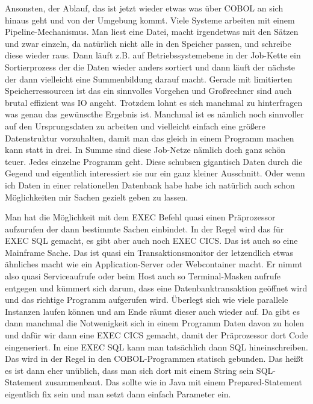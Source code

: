 {Ansonsten, der Ablauf, das ist jetzt wieder etwas was über COBOL an sich hinaus geht und von der Umgebung kommt. Viele Systeme arbeiten mit einem Pipeline-Mechanismus. Man liest eine Datei, macht irgendetwas mit den Sätzen und zwar einzeln, da natürlich nicht alle in den Speicher passen, und schreibe diese wieder raus. Dann läuft z.B. auf Betriebssystemebene in der Job-Kette ein Sortierprozess der die Daten wieder anders sortiert und dann läuft der nächste der dann vielleicht eine Summenbildung darauf macht. Gerade mit limitierten Speicherressourcen ist das ein sinnvolles Vorgehen und Großrechner sind auch brutal effizient was IO angeht. Trotzdem lohnt es sich manchmal zu hinterfragen was genau das gewünscthe Ergebnis ist. Manchmal ist es nämlich noch sinnvoller auf den Ursprungsdaten zu arbeiten und vielleicht einfach eine größere Datenstruktur vorzuhalten, damit man das gleich in einem Programm machen kann statt in drei. In Summe sind diese Job-Netze nämlich doch ganz schön teuer. Jedes einzelne Programm geht. Diese schubsen gigantisch Daten durch die Gegend und eigentlich interessiert sie nur ein ganz kleiner Ausschnitt. Oder wenn ich Daten in einer relationellen Datenbank habe habe ich natürlich auch schon Möglichkeiten mir Sachen gezielt geben zu lassen.

Man hat die Möglichkeit mit dem EXEC Befehl quasi einen Präprozessor aufzurufen der dann bestimmte Sachen einbindet. In der Regel wird das für EXEC SQL gemacht, es gibt aber auch noch EXEC CICS. Das ist auch so eine Mainframe Sache. Das ist quasi ein Transaktionsmonitor der letzendlich etwas ähnliches macht wie ein Application-Server oder Webcontainer macht. Er nimmt also quasi Serviceaufrufe oder beim Host auch so Terminal-Masken aufrufe entgegen und kümmert sich darum, dass eine Datenbanktransaktion geöffnet wird und das richtige Programm aufgerufen wird. Überlegt sich wie viele parallele Instanzen laufen können und am Ende räumt dieser auch wieder auf. Da gibt es dann manchmal die Notwenigkeit sich in einem Programm Daten davon zu holen und dafür wir dann eine EXEC CICS gemacht, damit der Präprozessor dort Code eingeneriert. In eine EXEC SQL kann man tatsächlich dann SQL hineinschreiben. Das wird in der Regel in den COBOL-Programmen statisch gebunden. Das heißt es ist dann eher unüblich, dass man sich dort mit einem String sein SQL-Statement zusammenbaut. Das sollte wie in Java mit einem Prepared-Statement eigentlich fix sein und man setzt dann einfach Parameter ein.

}
